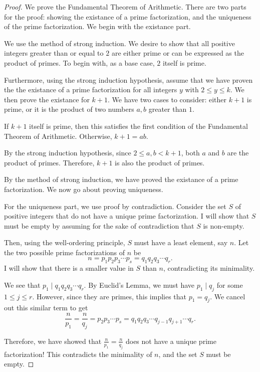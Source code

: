 \begin{proof} We prove the Fundamental Theorem of Arithmetic. There are two parts for the proof: showing the existance of a prime factorization, and the uniqueness of the prime factorization. We begin with the \color{blue} existance part.  
	
\clearpage
	
\color{black} We use the method of strong induction. We desire to show that all positive integers greater than or equal to $2$ are either prime or can be expressed as the product of primes. To begin with, as a \color{ForestGreen} base case, \color{black} $2$ itself is prime. 

Furthermore, using the \color{ForestGreen} strong induction hypothesis, \color{black} assume that we have proven the the existance of a prime factorization for all integers $y$ with $2\le y\le k$. We then prove the existance for $k+1$. We have two cases to consider: either $k+1$ is prime, or it is the product of two numbers $a,b$ greater than $1$.

If $k+1$ itself is prime, then this satisfies the first condition of the Fundamental Theorem of Arithmetic. Otherwise, $k+1=ab$. 

By the strong induction hypothesis, since $2\le a,b<k+1$, \color{black} both $a$ and $b$ are the product of primes. Therefore, $k+1$ is also the product of primes.

By the method of strong induction, we have proved the existance of a prime factorization. We now go about proving uniqueness. 

For the \color{blue} uniqueness part\color{black}, we use proof by contradiction. Consider the set $S$ of positive integers that do not have a unique prime factorization. I will show that $S$ must be empty by assuming for the sake of contradiction that $S$ is non-empty.

Then, using the well-ordering principle, $S$ must have a least element, say $n$. Let the two possible prime factorizations of $n$ be $$n=p_1p_2p_3\cdots p_s=q_1q_2q_3\cdots q_r.$$ I will show that there is a smaller value in $S$ than $n$, contradicting its minimality.  

We see that $p_1\mid q_1q_2q_3\cdots q_r$. By Euclid's Lemma, we must have $p_1\mid q_j$ for some $1\le j\le r$. However, since they are primes, this implies that $p_1=q_j$. We cancel out this similar term to get $$\frac{n}{p_1}=\frac{n}{q_j}=p_2p_3\cdots p_s=q_1q_2q_3\cdots q_{j-1}q_{j+1}\cdots q_r.$$ 

Therefore, we have showed that $\frac{n}{p_1}=\frac{n}{q_j}$ does not have a unique prime factorization! This contradicts the minimality of $n$, and the set $S$ must be empty.  \end{proof}

